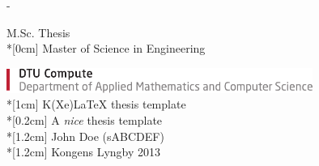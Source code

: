 \thispagestyle{empty}             %
\calccentering{\unitlength}
\begin{adjustwidth*}{\unitlength}{-\unitlength}
    \begin{adjustwidth}{-0.5cm}{-0.5cm}
        \sffamily
        \begin{flushright}
            M.Sc. Thesis\\*[0cm]
            Master of Science in Engineering\\
        \end{flushright}
        \vspace*{\fill}
        \noindent
        \includegraphics[width=0.75\textwidth]{graphics/DTU-Compute-B-UK}\\*[1cm]
        \HUGE K(Xe)LaTeX thesis template\\*[0.2cm]
        \Huge A \emph{nice} thesis template\\*[1.2cm]
        \large John Doe (sABCDEF)\\*[1.2cm]
        \small Kongens Lyngby 2013\\
    \end{adjustwidth}
\end{adjustwidth*}
\normalfont
\normalsize
